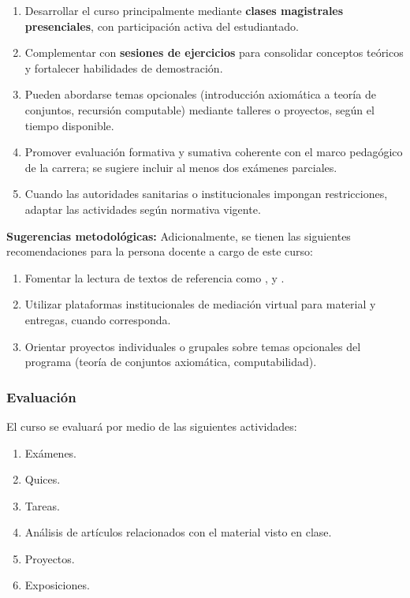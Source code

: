\begin{refsection}
\begin{enumerate}
    \item Desarrollar el curso principalmente mediante \textbf{clases magistrales presenciales}, con participación activa del estudiantado.
    \item Complementar con \textbf{sesiones de ejercicios} para consolidar conceptos teóricos y fortalecer habilidades de demostración.
    \item Pueden abordarse temas opcionales (introducción axiomática a teoría de conjuntos, recursión computable) mediante talleres o proyectos, según el tiempo disponible.
    \item Promover evaluación formativa y sumativa coherente con el marco pedagógico de la carrera; se sugiere incluir al menos dos exámenes parciales.
    \item Cuando las autoridades sanitarias o institucionales impongan restricciones, adaptar las actividades según normativa vigente.
\end{enumerate}

\textbf{Sugerencias metodológicas:} Adicionalmente, se tienen las siguientes recomendaciones para la persona docente a cargo de este curso:

\begin{enumerate}
    \item Fomentar la lectura de textos de referencia como \cite{HiL19}, \cite{EFT94} y \cite{CL2000}.
    \item Utilizar plataformas institucionales de mediación virtual para material y entregas, cuando corresponda.
    \item Orientar proyectos individuales o grupales sobre temas opcionales del programa (teoría de conjuntos axiomática, computabilidad).
\end{enumerate}

\subsubsection*{Evaluación}

El curso se evaluará por medio de las siguientes actividades:

\begin{enumerate}
\item Exámenes.
\item Quices.
\item Tareas.
\item Análisis de artículos relacionados con el material visto en clase.
\item Proyectos.
\item Exposiciones.
\end{enumerate}

\nocite{HiL19}
\nocite{CL2000}
\nocite{EFT94}
\nocite{Mar02}
\nocite{Poi00}
\nocite{Kun80}

\printcursosbibliography
\end{refsection}

